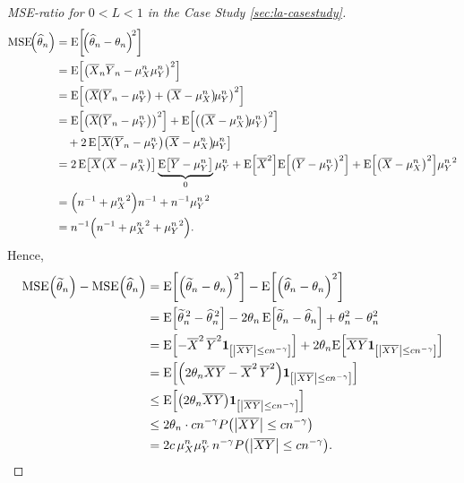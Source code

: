 \documentclass[ejs, twoside]{imsart}
\theoremstyle{plain}
\theoremstyle{remark}
\numberwithin{equation}{section}
\numberwithin{table}{section}
\numberwithin{figure}{section}
\let\originalleft\left
\let\originalright\right
\renewcommand{\left}{\mathopen{}\mathclose\bgroup\originalleft}
\renewcommand{\right}{\aftergroup\egroup\originalright}
\begin{document}
\begin{appendix}
\begin{proof}[MSE-ratio for \(0<L<1\) in the Case Study \ref{sec:la-casestudy}]
	\begin{align*}
		\operatorname{MSE}\!\left( \widehat{\theta}_n \right)
		&= \mean{\!\left( \widehat{\theta}_n - \theta_n \right)^{\!2}} \\
		&= \mean{\left( \overline{X}_n \overline{Y}_n - \mu_X^n \mu_Y^n \right) ^2} \\
		&= \mean{\left( \avg{X} \!\left( \overline{Y}_n - \mu_Y^n \right) +
			\left( \avg{X} - \mu_X^n \right)\! \mu_Y^n \right) ^2}\\
		&= \mean{\left( \avg{X} \!\left( \overline{Y}_n - \mu_Y^n \right) \right)^2} +
		\mean{\left( \left( \avg{X} - \mu_X^n \right)\! \mu_Y^n \right)^2}
		\\
		&\quad +
		2\,\mean{\avg{X} \!\left( \overline{Y}_n - \mu_Y^n \right)
			\left( \avg{X} - \mu_X^n \right)\! \mu_Y^n }\\
		&=2\,\mean{\avg{X}\left( \avg{X} - \mu_X^n \right) }\underbrace{\mean{\avg{Y}-\mu_Y^n}}_0\mu_Y^n + \mean{\avg{X}^2}\mean{\left( \avg{Y}-\mu_Y^n\right) ^2} + 
		\mean{\left( \avg{X}-\mu_X^n \right) ^2 } {\mu_Y^n}^2
		\\
		&= \left( n^{-1} + {\mu_X^n}^2 \right) n^{-1} + n^{-1} {\mu_Y^n}^2 \\
		&= n^{-1} \left( n^{-1} + {\mu_X^n}^2 + {\mu_Y^n}^2 \right)
		.
	\end{align*}
	Hence,
	\begin{align*}
		\operatorname{MSE}\!{\left( \widetilde{\theta}_n\right) } -\operatorname{MSE}\!{\left( \widehat{\theta}_n\right) }
		&= \mean{\left( \widetilde{\theta}_n - \theta_n \right)^2 } - \mean{\left( \widehat{\theta}_n - \theta_n \right)^2 } \\
		&= \mean{\widetilde{\theta}_n^{\,2}-\widehat{\theta}_n^{\,2}} -
		2\theta_n\,\mean{\widetilde{\theta}_n-\widehat{\theta}_n} +
		\theta_n^2-\theta_n^2 \\
		&= \mean{-\avg{X}^2\,\avg{Y}^2 \indc{\left| \avg{X}\avg{Y} \right| \le cn^{-\gamma} }} +
		2\theta_n \mean{\avg{X}\avg{Y}\indc{\left| \avg{X}\avg{Y} \right| \le cn^{-\gamma}}} \\
		&= \mean{\left( 2\theta_n\avg{X}\avg{Y} - \avg{X}^2\,\avg{Y}^2 \right)
			\indc{\left| \avg{X}\avg{Y} \right| \le cn^{-\gamma}}} \\
		&\le \mean{\left( 2\theta_n\avg{X}\avg{Y} \right)
			\indc{\left| \avg{X}\avg{Y} \right| \le cn^{-\gamma}}} \\
		&\le 2\theta_n \cdot cn^{-\gamma} P\left( \left| \avg{X}\avg{Y} \right| \le cn^{-\gamma} \right) \\
		&= 2c\,\mu_X^n \mu_Y^n \, n^{-\gamma} P\left( \left| \avg{X}\avg{Y} \right| \le cn^{-\gamma} \right)
		.
	\end{align*}
	

\end{proof}
\end{appendix}
\end{document}
